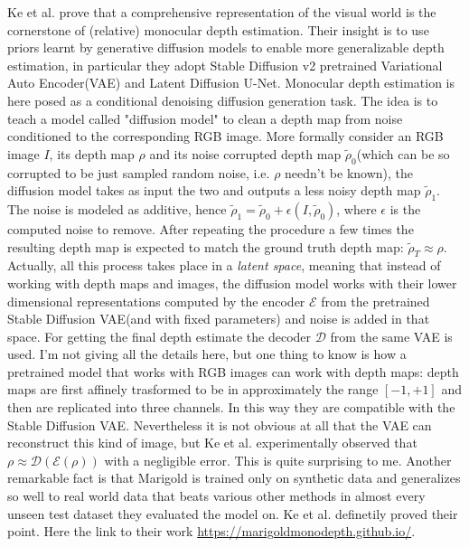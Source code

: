 Ke et al. \cite{Marigold} prove that a comprehensive representation of the visual world is the cornerstone of (relative) monocular depth estimation. Their insight is to use priors learnt by generative diffusion models to enable more generalizable depth estimation, in particular they adopt Stable Diffusion v2 \cite{StableDiffusionV2} pretrained Variational Auto Encoder(VAE) and Latent Diffusion U-Net. Monocular depth estimation is here posed as a conditional denoising diffusion generation task. The idea is to teach a model called "diffusion model" to clean a depth map from noise conditioned to the corresponding RGB image. More formally consider an RGB image $I$, its depth map $\rho$ and its noise corrupted depth map $\tilde{\rho}_{0}$(which can be so corrupted to be just sampled random noise, i.e. $\rho$ needn't be known), the diffusion model takes as input the two and outputs a less noisy depth map $\tilde{\rho}_{1}$. The noise is modeled as additive, hence $\tilde{\rho}_{1} = \tilde{\rho}_{0} + \epsilon(I, \tilde{\rho}_{0})$, where $\epsilon$ is the computed noise to remove. After repeating the procedure a few times the resulting depth map is expected to match the ground truth depth map: $\tilde{\rho}_{T} \approx \rho$. Actually, all this process takes place in a \textit{latent space}, meaning that instead of working with depth maps and images, the diffusion model works with their lower dimensional representations computed by the encoder $\mathcal{E}$ from the pretrained Stable Diffusion VAE(and with fixed parameters) and noise is added in that space. For getting the final depth estimate the decoder $\mathcal{D}$ from the same VAE is used. I'm not giving all the details here, but one thing to know is how a pretrained model that works with RGB images can work with depth maps: depth maps are first affinely trasformed to be in approximately the range $[-1, +1]$ and then are replicated into three channels. In this way they are compatible with the Stable Diffusion VAE. Nevertheless it is not obvious at all that the VAE can reconstruct this kind of image, but Ke et al. experimentally observed that $\rho \approx \mathcal{D}(\mathcal{E}(\rho))$ with a negligible error. This is quite surprising to me. Another remarkable fact is that Marigold is trained only on synthetic data and generalizes so well to real world data that beats various other methods in almost every unseen test dataset they evaluated the model on. Ke et al. definetily proved their point. Here the link to their work \url{https://marigoldmonodepth.github.io/}.